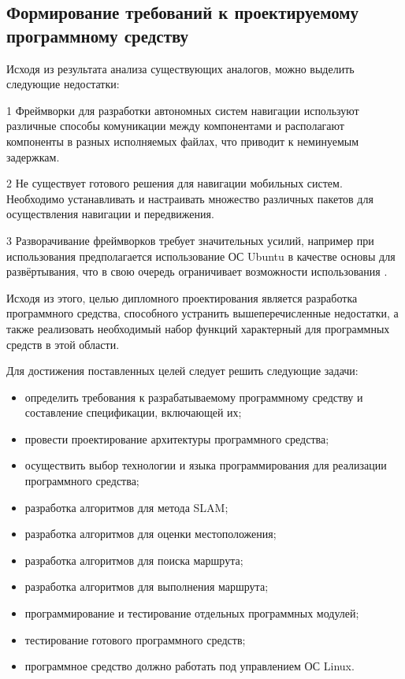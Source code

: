\subsection{Формирование требований к проектируемому программному средству}

Исходя из результата анализа существующих аналогов, можно выделить следующие недостатки:

1 Фреймворки для разработки автономных систем навигации используют различные
способы комуникации между компонентами и располагают компоненты в разных
исполняемых файлах, что приводит к неминуемым задержкам\cite{rosDelay}. 

2 Не существует готового решения для навигации мобильных систем. Необходимо
устанавливать и настраивать множество различных пакетов для осуществления
навигации и передвижения.

3 Разворачивание фреймворков требует значительных усилий, например при
использования \ros{} предполагается использование ОС Ubuntu в качестве основы
для развёртывания, что в свою очередь ограничивает возможности использования
\ros{}.

Исходя из этого, целью дипломного проектирования является разработка
программного средства, способного устранить вышеперечисленные недостатки, а
также реализовать необходимый набор функций характерный для программных средств
в этой области.

Для достижения поставленных целей следует решить следующие задачи: 
\begin{itemize}
	\item определить требования к разрабатываемому  программному  средству  и 
	составление спецификации, включающей их; 
	\item провести проектирование архитектуры программного средства; 
	\item осуществить выбор технологии и языка программирования  для
		реализации программного средства; 
	\item разработка алгоритмов для метода SLAM; 
	\item разработка алгоритмов для оценки местоположения; 
	\item разработка алгоритмов для поиска маршрута; 
	\item разработка алгоритмов для выполнения маршрута; 
	\item программирование и тестирование отдельных программных модулей; 
	\item тестирование готового программного средств;
	\item программное средство должно работать под управлением ОС Linux.
\end{itemize}
